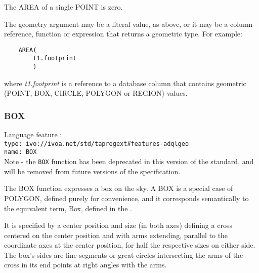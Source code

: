 \documentclass[11pt,a4paper]{ivoa}
\begin{document}
The AREA of a single POINT is zero.

The geometry argument may be a literal value, as above, or it may be a
column reference, function or expression that returns a geometric type.
For example:
\begin{verbatim}
    AREA(
        t1.footprint
        )
\end{verbatim}
where \textit{t1.footprint} is a reference to a database column that
contains geometric (POINT, BOX, CIRCLE, POLYGON or REGION) values.

\subsubsection{BOX}
\label{sec:functions.geom.box}
{\footnotesize Language feature :}\\
{\footnotesize \verb|type: ivo://ivoa.net/std/tapregext#features-adqlgeo|}\\
{\footnotesize \verb|name: BOX|}\\

Note - the \verb|BOX| function has been deprecated in this version of the standard,
and will be removed from future versions of the specification.

The BOX function expresses a box on the sky. A BOX is a special case of POLYGON,
defined purely for convenience,
and it corresponds semantically to the equivalent term, Box, defined in
the \STCSpec{}.

It is specified by a center position and size
(in both axes) defining a cross centered on the center position and
with arms extending, parallel to the coordinate axes at the center position,
for half the respective sizes on either side. The box’s sides are line
segments or great circles intersecting the arms of the cross in its end
points at right angles with the arms.


\end{document}
